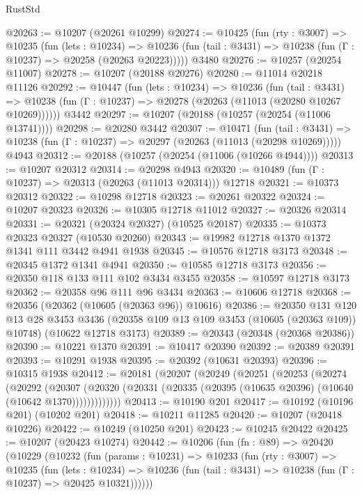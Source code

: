 \begin{lexlean}{RustStd}
\begin{coremodule}
@20263 := @10207 (@20261 @10299)
@20274 := @10425
    (fun (rty : @3007) =>
    @10235
      (fun (lets : @10234) =>
      @10236 (fun (tail : @3431) => @10238 (fun (Γ : @10237) => @20258 (@20263 @20223)))))
    @3480
@20276 := @10257 (@20254 @11007)
@20278 := @10207 (@20188 @20276)
@20280 := @11014 @20218 @11126
@20292 := @10447
    (fun (lets : @10234) =>
    @10236
      (fun (tail : @3431) =>
      @10238 (fun (Γ : @10237) => @20278 (@20263 (@11013 (@20280 @10267 @10269))))))
    @3442
@20297 := @10207 (@20188 (@10257 (@20254 (@11006 @13741))))
@20298 := @20280 @3442
@20307 := @10471
    (fun (tail : @3431) => @10238 (fun (Γ : @10237) => @20297 (@20263 (@11013 (@20298 @10269)))))
    @4943
@20312 := @20188 (@10257 (@20254 (@11006 (@10266 @4944))))
@20313 := @10207 @20312
@20314 := @20298 @4943
@20320 := @10489 (fun (Γ : @10237) => @20313 (@20263 (@11013 @20314))) @12718
@20321 := @10373 @20312
@20322 := @10298 @12718
@20323 := @20261 @20322
@20324 := @10207 @20323
@20326 := @10305 @12718 @11012
@20327 := @20326 @20314
@20331 := @20321 (@20324 @20327) (@10525 @20187)
@20335 := @10373 @20323 @20327 (@10530 @20260)
@20343 := @19982 @12718 @1370 @1372 @1341 @111 @3442 @4941 @1938
@20345 := @10576 @12718 @3173
@20348 := @20345 @1372 @1341 @4941
@20350 := @10585 @12718 @3173
@20356 := @20350 @118 @133 @111 @102 @3434 @3455
@20358 := @10597 @12718 @3173
@20362 := @20358 @96 @111 @96 @3434
@20363 := @10606 @12718
@20368 := @20356 (@20362 (@10605 (@20363 @96)) @10616)
@20386 := @20350
    @131
    @120
    @13
    @28
    @3453
    @3436
    (@20358 @109 @13 @109 @3453 (@10605 (@20363 @109)) @10748)
    (@10622 @12718 @3173)
@20389 := @20343 (@20348 (@20368 @20386))
@20390 := @10221 @1370
@20391 := @10417 @20390
@20392 := @20389 @20391
@20393 := @10291 @1938
@20395 := @20392 (@10631 @20393)
@20396 := @10315 @1938
@20412 := @20181
    (@20207
      (@20249
        (@20251
          (@20253
            (@20274
              (@20292
                (@20307
                  (@20320 (@20331 (@20335 (@20395 (@10635 @20396) (@10640 (@10642 @1370)))))))))))))
@20413 := @10190 @201
@20417 := @10192 (@10196 @201) (@10202 @201)
@20418 := @10211 @11285
@20420 := @10207 (@20418 @10226)
@20422 := @10249 (@10250 @201)
@20423 := @10245 @20422
@20425 := @10207 (@20423 @10274)
@20442 := @10206
    (fun (fn : @89) =>
    @20420
      (@10229
        (@10232
          (fun (params : @10231) =>
          @10233
            (fun (rty : @3007) =>
            @10235
              (fun (lets : @10234) =>
              @10236 (fun (tail : @3431) => @10238 (fun (Γ : @10237) => @20425 @10321))))))

\end{coremodule}
\end{lexlean}
